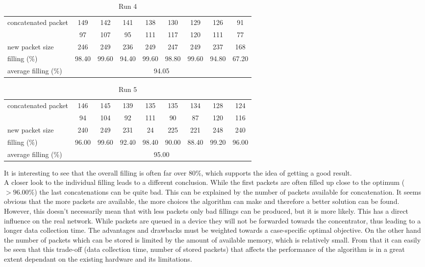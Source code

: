 \begin{table}[H]
	\begin{tabular}{|l||c|c|c|c|c|c|c|c|}
	\hline
	\multirow{2}{*}{concatenated packet} & 149 & 142 & 141 & 138 & 130 & 129 & 126 & 91 \\
	& 97 & 107 & 95 & 111 & 117 & 120 & 111 & 77 \\ \hline
	new packet size & 246 & 249 & 236 & 249 & 247 & 249 & 237 & 168 \\ \hline
	filling	(\%) & 98.40 & 99.60 & 94.40 & 99.60 & 98.80 & 99.60 & 94.80 & 67.20 \\ \hline
	average filling	(\%) & \multicolumn{8}{c|}{94.05} \\ \hline
	\end{tabular}
	\caption{Run 4}
	\label{table:run4}
\end{table}

\begin{table}[H]
	\begin{tabular}{|l||c|c|c|c|c|c|c|c|}
	\hline
	\multirow{2}{*}{concatenated packet} & 146 & 145 & 139 & 135 & 135 & 134 & 128 & 124 \\
	& 94 & 104 & 92 & 111 & 90 & 87 & 120 & 116 \\ \hline
	new packet size & 240 & 249 & 231 & 24 & 225 & 221 & 248 & 240 \\ \hline
	filling	(\%) & 96.00 & 99.60 & 92.40 & 98.40 & 90.00 & 88.40 & 99.20 & 96.00 \\ \hline
	average filling	(\%) & \multicolumn{8}{c|}{95.00} \\ \hline
	\end{tabular}
	\caption{Run 5}
	\label{table:run5}
\end{table}

It is interesting to see that the overall filling is often far over 80\%, which supports the idea of getting a good result.\\
A closer look to the individual filling leads to a different conclusion. While the first packets are often filled up close to the optimum ($ > 96.00\%$) the last concatenations can be quite bad. This can be explained by the number of packets available for concatenation. It seems obvious that the more packets are available, the more choices the algorithm can make and therefore a better solution can be found. However, this doesn't necessarily mean that with less packets only bad fillings can be produced, but it is more likely. This has a direct influence on the real network. While packets are queued in a device they will not be forwarded towards the concentrator, thus leading to a longer data collection time. The advantages and drawbacks must be weighted towards a case-specific optimal objective. On the other hand the number of packets which can be stored is limited by the amount of available memory, which is relatively small. From that it can easily be seen that this trade-off (data collection time, number of stored packets) that affects the performance of the algorithm is in a great extent dependant on  the existing hardware and its limitations.


